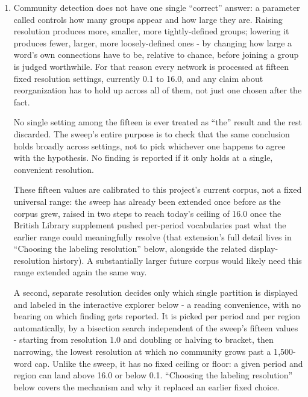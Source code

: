 \documentclass[11pt]{article}
\begin{document}
\begin{enumerate}
  \item {} Community
    detection does not have one single ``correct'' answer: a parameter
    called  controls how many groups appear and how
    large they are. Raising resolution produces more, smaller, more
    tightly-defined groups; lowering it produces fewer, larger, more
    loosely-defined ones - by changing how large a word's own connections
    have to be, relative to chance, before joining a group is judged
    worthwhile. For that reason every network is processed at fifteen fixed
    resolution settings, currently 0.1 to 16.0, and any claim about
    reorganization has to hold up across all of them, not just one
    chosen after the fact.

    \begin{claimbox}
     No single setting among the fifteen is ever
    treated as ``the'' result and the rest discarded. The sweep's entire
    purpose is to check that the same conclusion holds broadly across
    settings, not to pick whichever one happens to agree with the
    hypothesis. No finding is reported if it only holds at a single,
    convenient resolution.
    \end{claimbox}

    These fifteen values are calibrated to this project's current
    corpus, not a fixed universal range: the sweep has already been
    extended once before as the corpus grew, raised in two steps to
    reach today's ceiling of 16.0 once the British Library supplement
    pushed per-period vocabularies past what the earlier range could
    meaningfully resolve (that extension's full detail lives in
    ``Choosing the labeling resolution'' below, alongside the related
    display-resolution history). A substantially larger future corpus
    would likely need this range extended again the same way.

    A second, separate resolution decides only which single partition is
    displayed and labeled in the interactive explorer below - a reading
    convenience, with no bearing on which finding gets reported. It is
    picked per period and per region automatically, by a bisection
    search independent of the sweep's fifteen values - starting from
    resolution 1.0 and doubling or halving to bracket, then narrowing,
    the lowest resolution at which no community grows past a
    1{,}500-word cap. Unlike the sweep, it has no fixed ceiling or
    floor: a given period and region can land above 16.0 or below 0.1.
    ``Choosing the labeling resolution'' below covers the mechanism and
    why it replaced an earlier fixed choice.


\end{enumerate}
\end{document}
